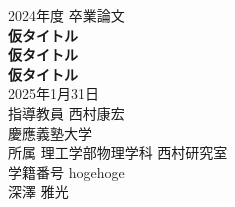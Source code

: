 \documentclass[uplatex,dvipdfmx,titlepage]{jsreport}
\begin{document}
\begin{titlepage}
\centering
\vspace*{20mm}
{\Large\noindent 2024年度 卒業論文}\\
\vspace{40mm}
{\huge\noindent\textbf{仮タイトル}}\\
\medskip
{\huge\noindent\textbf{仮タイトル}}\\
\medskip
{\huge\noindent\textbf{仮タイトル}}\\
\vspace{\baselineskip}
\vspace{40mm}
{\Large\noindent
2025年1月31日\\
\vspace{\baselineskip}
指導教員 西村康宏\\
\vspace{\baselineskip}
慶應義塾大学\\
所属 理工学部物理学科 西村研究室\\
\vspace{\baselineskip}
学籍番号 hogehoge\\
深澤 雅光 \\
}
\end{titlepage}
\begin{abstract}
\end{abstract}
\tableofcontents
\clearpage
\listoffigures
\clearpage
\listoftables
\clearpage



\end{document}
